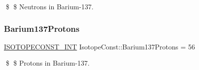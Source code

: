 \$ \$ Neutrons in Barium-\/137. \mbox{\label{group___isotope_const-_barium-_ba137_gaa474ee2f40d6f6334c39bde65b2d4fc3}} 
\subsubsection{\texorpdfstring{Barium137\+Protons}{Barium137Protons}}
{\footnotesize\ttfamily \mbox{\hyperlink{group___isotope_const-_macros_ga5f18360b3e99483a35c32d789e62621c}{I\+S\+O\+T\+O\+P\+E\+C\+O\+N\+S\+T\+\_\+\+I\+NT}} Isotope\+Const\+::\+Barium137\+Protons = 56}

\$ \$ Protons in Barium-\/137. 